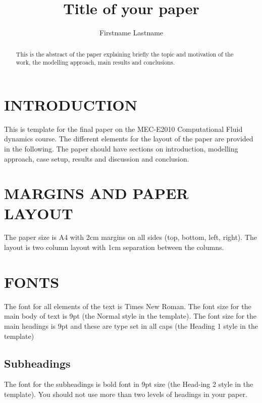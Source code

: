 \documentclass{cfm_paper}
\begin{document}
\title{Title of your paper}
\author{Firstname Lastname}

\maketitle

\begin{abstract}
This is the abstract of the paper explaining briefly the topic and motivation of the work, the modelling approach, main results and conclusions.
\end{abstract}


\section*{INTRODUCTION} %
This is template for the final paper on the MEC-E2010 Computational Fluid dynamics course. The different elements for the layout of the paper are provided in the following. The paper should have sections on introduction, modelling approach, case setup, results and discussion and conclusion.

\section*{MARGINS AND PAPER LAYOUT}
The paper size is A4 with 2cm margins on all sides (top, bottom, left, right). The layout is two column layout with 1cm separation between the columns. 

\section*{FONTS}
The font for all elements of the text is Times New Roman. The font size for the main body of text is 9pt (the Normal style in the template). The font size for the main headings is 9pt and these are type set in all caps (the Heading 1 style in the template)

\subsection*{Subheadings}
The font for the subheadings is bold font in 9pt size (the Head-ing 2 style in the template). You should not use more than two levels of headings in your paper.
\end{document}
